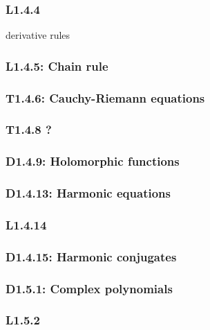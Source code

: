\documentclass{article}
\begin{document}
\begin{multicols*}{3}
\subsubsection*{L1.4.4}
derivative rules

\subsubsection*{L1.4.5: Chain rule}

\subsubsection*{T1.4.6: Cauchy-Riemann equations}

\subsubsection*{T1.4.8 ?}

\subsubsection*{D1.4.9: Holomorphic functions}

\subsubsection*{D1.4.13: Harmonic equations}

\subsubsection*{L1.4.14}

\subsubsection*{D1.4.15: Harmonic conjugates}

\newcolumn

\subsubsection*{D1.5.1: Complex polynomials}

\subsubsection*{L1.5.2}

\end{multicols*}
\end{document}
